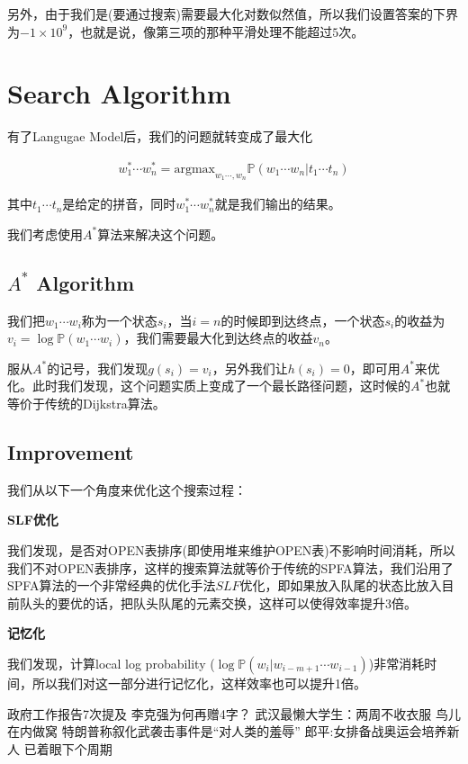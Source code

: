 \documentclass{article}
\begin{document}
另外，由于我们是(要通过搜索)需要最大化对数似然值，所以我们设置答案的下界为$-1\times 10^9$，也就是说，像第三项的那种平滑处理不能超过$5$次。

\section{Search Algorithm}

有了Langugae Model后，我们的问题就转变成了最大化

\begin{eqnarray}
	w_1^*\cdots w_n^* = \mathrm{argmax}_{w_1\cdots, w_n} \mathbb{P}(w_1\cdots w_n\lvert t_1 \cdots t_n)
\end{eqnarray}

其中$t_1 \cdots t_n$是给定的拼音，同时$w_1^*\cdots w_n^*$就是我们输出的结果。

我们考虑使用$A^*$算法来解决这个问题。

\subsection{$A^*$ Algorithm}

我们把$w_1\cdots w_i$称为一个状态$s_i$，当$i=n$的时候即到达终点，一个状态$s_i$的收益为$v_i = \log \mathbb{P}(w_1\cdots w_i)$，我们需要最大化到达终点的收益$v_n$。

服从$A^*$的记号，我们发现$g(s_i)=v_i$，另外我们让$h(s_i)=0$，即可用$A^*$来优化。此时我们发现，这个问题实质上变成了一个最长路径问题，这时候的$A^*$也就等价于传统的Dijkstra算法。

\subsection{Improvement}

我们从以下一个角度来优化这个搜索过程：

\noindent \textbf{SLF优化}

我们发现，是否对OPEN表排序(即使用堆来维护OPEN表)不影响时间消耗，所以我们不对OPEN表排序，这样的搜索算法就等价于传统的SPFA算法，我们沿用了SPFA算法的一个非常经典的优化手法$SLF$优化，即如果放入队尾的状态比放入目前队头的要优的话，把队头队尾的元素交换，这样可以使得效率提升3倍。

\noindent \textbf{记忆化}

我们发现，计算local log probability ($\log\mathbb{P}(w_i\lvert w_{i-m+1}\cdots w_{i-1})$)非常消耗时间，所以我们对这一部分进行记忆化，这样效率也可以提升1倍。

政府工作报告7次提及 李克强为何再赠4字？
武汉最懒大学生：两周不收衣服 鸟儿在内做窝
特朗普称叙化武袭击事件是“对人类的羞辱”
郎平:女排备战奥运会培养新人 已着眼下个周期
\end{document}
